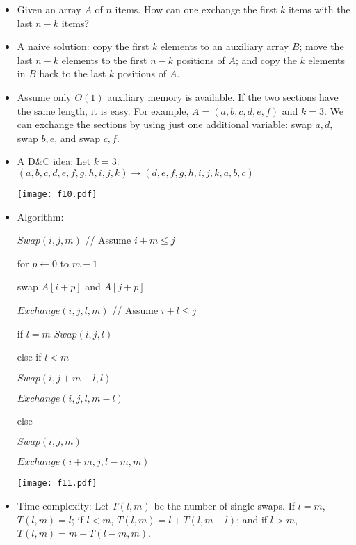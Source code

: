 \documentclass{article}
\begin{document}
\begin{itemize}

\item Given an array $A$ of $n$ items. How can one exchange the first
$k$ items with the last $n-k$ items?

\item A naive solution: copy the first $k$ elements to an auxiliary
array $B$; move the last $n-k$ elements to the first $n-k$ positions
of $A$; and copy the $k$ elements in $B$ back to the last $k$ positions
of $A$.

\item Assume only $\Theta(1)$ auxiliary memory is available. If the two sections have
the same length, it is easy. For example, $A=(a,b,c,d,e,f)$ and $k=3$.
We can exchange the sections by using just one additional variable:
swap $a,d$, swap $b,e$, and swap $c,f$.

\item A D\&C idea: Let $k=3$. $(a,b,c,d,e,f,g,h,i,j,k)\rightarrow
(d,e,f,g,h,i,j,k,a,b,c)$
 
\vskip 0.25cm
\begin{center}
\texttt{[image: f10.pdf]}
\end{center}

\item Algorithm: 

$Swap(i,j,m)$ // Assume $i+m\le j$

\qquad for $p\leftarrow 0 $ to $m-1$

\qquad\qquad swap $A[i+p]$ and $A[j+p]$

$Exchange(i,j,l,m)$ // Assume $i+l\le j$

\qquad if $l=m$ $Swap(i,j,l)$

\qquad else if $l<m$

\qquad\qquad\qquad $Swap(i,j+m-l,l)$

\qquad\qquad\qquad $Exchange(i,j,l,m-l)$

\qquad\qquad else

\qquad\qquad\qquad $Swap(i,j,m)$

\qquad\qquad\qquad $Exchange(i+m,j,l-m,m)$

\vskip 0.25cm
\begin{center}
\texttt{[image: f11.pdf]}
\end{center}

\item Time complexity: Let $T(l,m)$ be the number of single swaps.
If $l=m$, $T(l,m)=l$; if $l<m$, $T(l,m)=l+T(l,m-l)$; and
if $l>m$, $T(l,m)=m+T(l-m,m)$.


\end{itemize}
\end{document}
